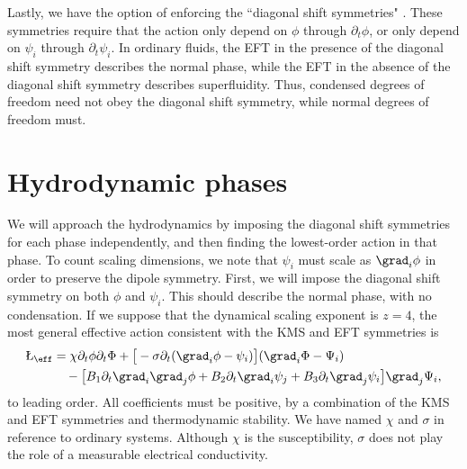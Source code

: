 Lastly, we have the option of enforcing the ``diagonal shift symmetries" \cite{Liu2018Lectures}. These symmetries require that the action only depend on $\phi$ through $\partial_t \phi$, or only depend on $\psi_i$ through $\partial_t \psi_i$. In ordinary fluids, the EFT in the presence of the diagonal shift symmetry describes the normal phase, while the EFT in the absence of the diagonal shift symmetry describes superfluidity. Thus, condensed degrees of freedom need not obey the diagonal shift symmetry, while normal degrees of freedom must.

\section{Hydrodynamic phases}

We will approach the hydrodynamics by imposing the diagonal shift symmetries for each phase independently, and then finding the lowest-order action in that phase. To count scaling dimensions, we note that $\psi_i$ must scale as $\grad_i\phi$ in order to preserve the dipole symmetry. First, we will impose the diagonal shift symmetry on both $\phi$ and $\psi_i$. This should describe the normal phase, with no condensation. If we suppose that the dynamical scaling exponent is $z=4$, the most general effective action consistent with the KMS and EFT symmetries is
\begin{align}
\L_\eff &= \chi \partial_t \phi \partial_t \Phi  + \big[ -\sigma \partial_t(\grad_i \phi - \psi_i)\big] (\grad_i \Phi - \Psi_i)  \nonumber\\
&\quad - \big[ B_1\partial_t \grad_i\grad_j \phi  + B_2 \partial_t \grad_i \psi_j + B_3 \partial_t \grad_j \psi_i \big] \grad_j \Psi_i,
\end{align}
to leading order. All coefficients must be positive, by a combination of the KMS and EFT symmetries and thermodynamic stability. We have named $\chi$ and $\sigma$ in reference to ordinary systems. Although $\chi$ is the susceptibility, $\sigma$ does not play the role of a measurable electrical conductivity.

